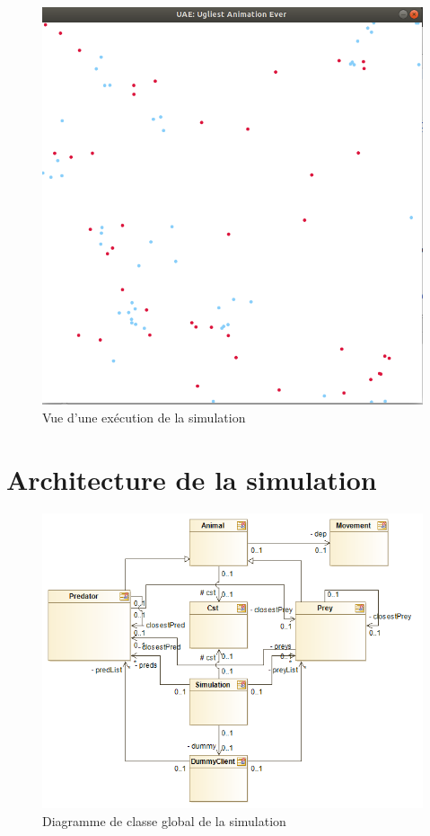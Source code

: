 \documentclass[12pt,a4paper,titlepage]{article}
\begin{document}
\FloatBarrier
\begin{figure}[h]
\includegraphics[width = \textwidth]{"../diagrammes/sim"}
\caption{Vue d'une exécution de la simulation}
\label{sim}
\end{figure}

\FloatBarrier

\section{Architecture de la simulation}
\begin{figure}[h]
\includegraphics[width = \textwidth]{"../diagrammes/Overall"}
\caption{Diagramme de classe global de la simulation}
\label{Overall}
\end{figure}
\end{document}
